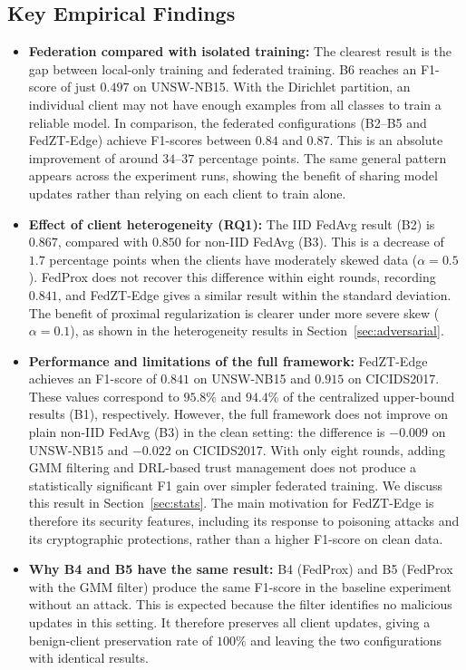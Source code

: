 \documentclass[11pt,a4paper]{article}
\begin{document}
\subsection{Key Empirical Findings}
\begin{itemize}[leftmargin=1.6em,itemsep=2pt]
    \item \textbf{Federation compared with isolated training:} The clearest result is the gap between local-only training and federated training. B6 reaches an F1-score of just $0.497$ on UNSW-NB15. With the Dirichlet partition, an individual client may not have enough examples from all classes to train a reliable model. In comparison, the federated configurations (B2--B5 and FedZT-Edge) achieve F1-scores between $0.84$ and $0.87$. This is an absolute improvement of around $34$--$37$ percentage points. The same general pattern appears across the experiment runs, showing the benefit of sharing model updates rather than relying on each client to train alone.

    \item \textbf{Effect of client heterogeneity (RQ1):} The IID FedAvg result (B2) is $0.867$, compared with $0.850$ for non-IID FedAvg (B3). This is a decrease of $1.7$ percentage points when the clients have moderately skewed data ($\alpha=0.5$). FedProx does not recover this difference within eight rounds, recording $0.841$, and FedZT-Edge gives a similar result within the standard deviation. The benefit of proximal regularization is clearer under more severe skew ($\alpha=0.1$), as shown in the heterogeneity results in Section~\ref{sec:adversarial}.

    \item \textbf{Performance and limitations of the full framework:} FedZT-Edge achieves an F1-score of $0.841$ on UNSW-NB15 and $0.915$ on CICIDS2017. These values correspond to $95.8\%$ and $94.4\%$ of the centralized upper-bound results (B1), respectively. However, the full framework does not improve on plain non-IID FedAvg (B3) in the clean setting: the difference is $-0.009$ on UNSW-NB15 and $-0.022$ on CICIDS2017. With only eight rounds, adding GMM filtering and DRL-based trust management does not produce a statistically significant F1 gain over simpler federated training. We discuss this result in Section~\ref{sec:stats}. The main motivation for FedZT-Edge is therefore its security features, including its response to poisoning attacks and its cryptographic protections, rather than a higher F1-score on clean data.

    \item \textbf{Why B4 and B5 have the same result:} B4 (FedProx) and B5 (FedProx with the GMM filter) produce the same F1-score in the baseline experiment without an attack. This is expected because the filter identifies no malicious updates in this setting. It therefore preserves all client updates, giving a benign-client preservation rate of $100\%$ and leaving the two configurations with identical results.
\end{itemize}
\end{document}
